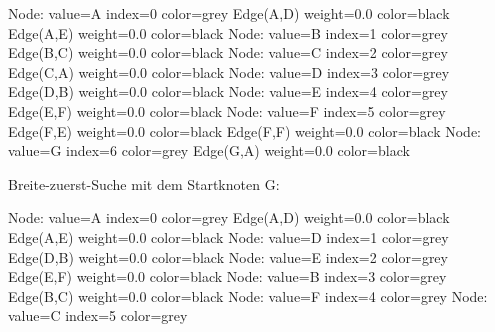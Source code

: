 Node: value=A index=0 color=grey
   Edge(A,D) weight=0.0 color=black
   Edge(A,E) weight=0.0 color=black
Node: value=B index=1 color=grey
   Edge(B,C) weight=0.0 color=black
Node: value=C index=2 color=grey
   Edge(C,A) weight=0.0 color=black
Node: value=D index=3 color=grey
   Edge(D,B) weight=0.0 color=black
Node: value=E index=4 color=grey
   Edge(E,F) weight=0.0 color=black
Node: value=F index=5 color=grey
   Edge(F,E) weight=0.0 color=black
   Edge(F,F) weight=0.0 color=black
Node: value=G index=6 color=grey
   Edge(G,A) weight=0.0 color=black


Breite-zuerst-Suche mit dem Startknoten G:

Node: value=A index=0 color=grey
   Edge(A,D) weight=0.0 color=black
   Edge(A,E) weight=0.0 color=black
Node: value=D index=1 color=grey
   Edge(D,B) weight=0.0 color=black
Node: value=E index=2 color=grey
   Edge(E,F) weight=0.0 color=black
Node: value=B index=3 color=grey
   Edge(B,C) weight=0.0 color=black
Node: value=F index=4 color=grey
Node: value=C index=5 color=grey
